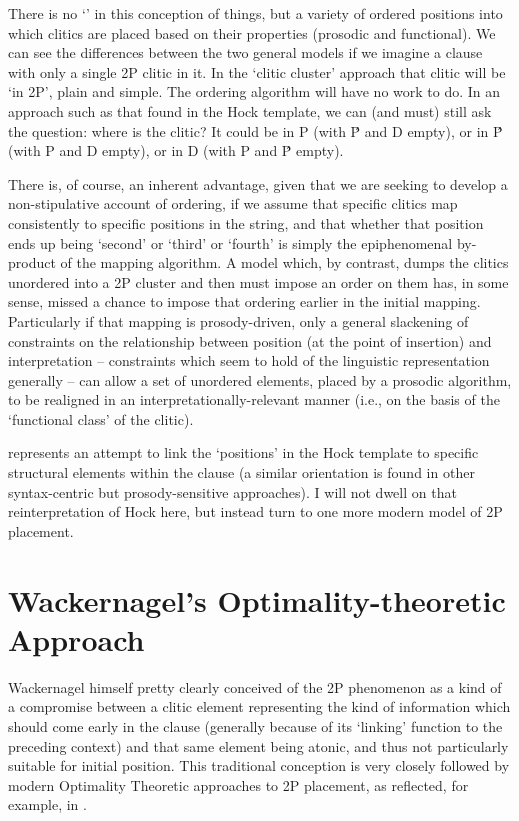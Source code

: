 \documentclass[output=paper,
modfonts
]{LSP/langsci}
\begin{document}
\noindent There is no `' in this conception of things, but a variety of ordered
positions into which clitics are placed based on their properties (prosodic and functional). We can
see the differences between the two general models if we imagine a clause with only a single 2P clitic
in it. In the `clitic cluster' approach that clitic will be `in 2P', plain and simple. The ordering
algorithm will have no work to do. In an approach such as that found in the Hock template, we can
(and must) still ask the question: where is the clitic? It could be in P (with \'{P} and D empty),
or in \'{P} (with P and D empty), or in D (with P and \'{P} empty).

There is, of course, an inherent advantage, given that we are seeking to develop a non-stipulative account
of ordering, if we assume that specific clitics map consistently to specific positions in the
string, and that whether that position ends up being `second' or `third' or `fourth' is simply
the epiphenomenal by-product of the mapping algorithm. A model which, by contrast, dumps the
clitics unordered into a 2P cluster and then must impose an order on them has, in some sense,
missed a chance to impose that ordering earlier in the initial mapping. Particularly if that
mapping is prosody-driven, only a general slackening of constraints on the relationship between
position (at the point of insertion) and interpretation -- constraints which seem to hold of the linguistic
representation generally -- can allow a set of unordered elements, placed by a prosodic algorithm,
to be realigned in an interpretationally-relevant manner (i.e., on the basis of the `functional
class' of the clitic).

\citet{hale1996} represents an attempt to link the `positions' in the Hock template
to specific structural elements within the clause (a similar orientation is found in other
syntax-centric but prosody-sensitive approaches). I will not dwell on that reinterpretation
of Hock here, but instead turn to one more modern model of 2P placement.

\section{Wackernagel's Optimality-theoretic Approach}
Wackernagel himself pretty clearly conceived of the 2P phenomenon as a kind of
a compromise between a clitic element representing the kind of information which should come
early in the clause (generally because of its `linking' function to the preceding context)
and that same element being atonic, and thus not particularly suitable for initial position.
This traditional conception is very closely followed by modern Optimality Theoretic approaches
to 2P placement, as reflected, for example, in \citet{anderson2005}.
\end{document}

